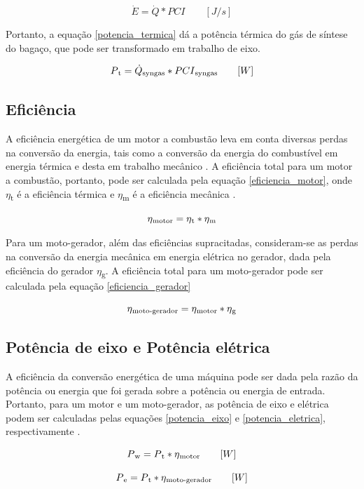 \begin{equation} \label{consumo_energetico}
\dot{E} = \dot{Q} * PCI   \quad\quad  [J/s]
\end{equation}

Portanto, a equação \ref{potencia_termica} dá a potência térmica do gás de síntese do bagaço, que pode ser transformado em trabalho de eixo.

\begin{equation} \label{potencia_termica}
P\textsubscript{t} = \dot{Q}\textsubscript{syngas} * PCI\textsubscript{syngas} \quad\quad  [W]
\end{equation}

\subsection{Eficiência}

A eficiência energética de um motor a combustão leva em conta diversas perdas na conversão da energia, tais como a conversão da energia do combustível em energia térmica e desta em trabalho mecânico . A eficiência total para um motor a combustão, portanto, pode ser calculada pela equação \ref{eficiencia_motor}, onde $\eta$\textsubscript{t} é a eficiência térmica e $\eta$\textsubscript{m} é a eficiência mecânica \cite{brunetti2012}.

\begin{equation} \label{eficiencia_motor}
\eta\textsubscript{motor} = \eta\textsubscript{t} * \eta\textsubscript{m} 
\end{equation}

Para um moto-gerador, além das eficiências supracitadas, consideram-se as perdas na conversão da energia mecânica em energia elétrica no gerador, dada pela eficiência do gerador $\eta$\textsubscript{g}. A eficiência total para um moto-gerador pode ser calculada pela equação \ref{eficiencia_gerador}

\begin{equation} \label{eficiencia_gerador}
\eta\textsubscript{moto-gerador} = \eta\textsubscript{motor} * \eta\textsubscript{g}
\end{equation}


\subsection{Potência de eixo e Potência elétrica}

A eficiência da conversão energética de uma máquina pode ser dada pela razão da potência ou energia que foi gerada sobre a potência ou energia de entrada. Portanto, para um motor e um moto-gerador, as potência de eixo e elétrica podem ser calculadas pelas equações \ref{potencia_eixo} e \ref{potencia_eletrica}, respectivamente \cite{brunetti2012}.

\begin{equation} \label{potencia_eixo}
P\textsubscript{w} = P\textsubscript{t} * \eta\textsubscript{motor} \qquad [W]
\end{equation}

\begin{equation} \label{potencia_eletrica}
P\textsubscript{e} = P\textsubscript{t} * \eta\textsubscript{moto-gerador} \qquad [W]
\end{equation}


